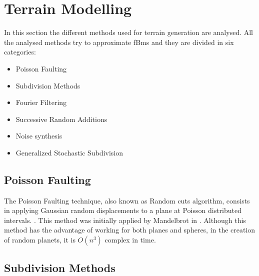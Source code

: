 \section{Terrain Modelling}

In this section the different methods used for terrain generation are analysed. All the analysed methods try to approximate fBms and they are divided in six categories:
\begin{itemize}
	\item Poisson Faulting
	\item Subdivision Methods
	\item Fourier Filtering
	\item Successive Random Additions
	\item Noise synthesis
	\item Generalized Stochastic Subdivision
\end{itemize}


\subsection{Poisson Faulting}

The Poisson Faulting technique, also known as Random cuts algorithm, consists in applying Gaussian random displacements to a plane at Poisson distributed intervals. \cite{Musgrave1989}. This method was initially applied by Mandelbrot in \cite{Mandelbrot1983}. Although this method has the advantage of working for both planes and spheres, in the creation of random planets, it is $O(n^3)$ complex in time.

\subsection{Subdivision Methods}

